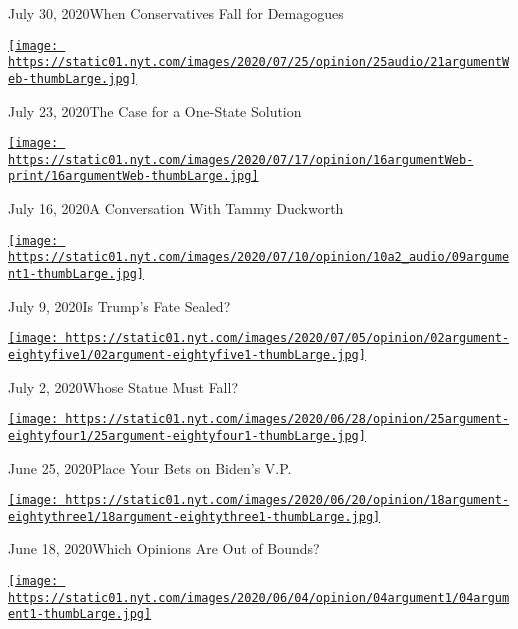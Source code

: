 July 30, 2020When Conservatives Fall for Demagogues

\href{https://www.nytimes.com/2020/07/23/opinion/the-argument-israel-palestinian.html?action=click\&module=audio-series-bar\&region=header\&pgtype=Article}{\texttt{[image: https://static01.nyt.com/images/2020/07/25/opinion/25audio/21argumentWeb-thumbLarge.jpg]}}

July 23, 2020The Case for a One-State Solution

\href{https://www.nytimes.com/2020/07/16/opinion/the-argument-tammy-duckworth.html?action=click\&module=audio-series-bar\&region=header\&pgtype=Article}{\texttt{[image: https://static01.nyt.com/images/2020/07/17/opinion/16argumentWeb-print/16argumentWeb-thumbLarge.jpg]}}

July 16, 2020A Conversation With Tammy Duckworth

\href{https://www.nytimes.com/2020/07/09/opinion/is-trumps-fate-sealed.html?action=click\&module=audio-series-bar\&region=header\&pgtype=Article}{\texttt{[image: https://static01.nyt.com/images/2020/07/10/opinion/10a2\_audio/09argument1-thumbLarge.jpg]}}

July 9, 2020Is Trump's Fate Sealed?

\href{https://www.nytimes.com/2020/07/02/opinion/the-argument-protest-statue-revolution.html?action=click\&module=audio-series-bar\&region=header\&pgtype=Article}{\texttt{[image: https://static01.nyt.com/images/2020/07/05/opinion/02argument-eightyfive1/02argument-eightyfive1-thumbLarge.jpg]}}

July 2, 2020Whose Statue Must Fall?

\href{https://www.nytimes.com/2020/06/25/opinion/the-argument-biden-vice-president-supreme-court.html?action=click\&module=audio-series-bar\&region=header\&pgtype=Article}{\texttt{[image: https://static01.nyt.com/images/2020/06/28/opinion/25argument-eightyfour1/25argument-eightyfour1-thumbLarge.jpg]}}

June 25, 2020Place Your Bets on Biden's V.P.

\href{https://www.nytimes.com/2020/06/18/opinion/the-argument-tom-cotton-resignation.html?action=click\&module=audio-series-bar\&region=header\&pgtype=Article}{\texttt{[image: https://static01.nyt.com/images/2020/06/20/opinion/18argument-eightythree1/18argument-eightythree1-thumbLarge.jpg]}}

June 18, 2020Which Opinions Are Out of Bounds?

\href{https://www.nytimes.com/2020/06/04/opinion/the-argument-protest-riot-violence.html?action=click\&module=audio-series-bar\&region=header\&pgtype=Article}{\texttt{[image: https://static01.nyt.com/images/2020/06/04/opinion/04argument1/04argument1-thumbLarge.jpg]}}

